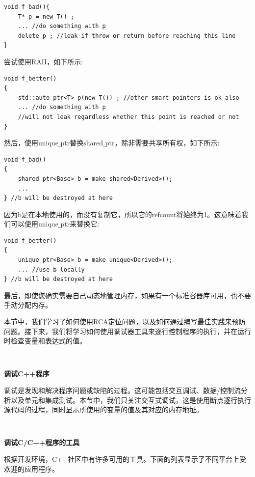 \begin{lstlisting}[caption={}]
void f_bad(){
	T* p = new T() ;
	... //do something with p
	delete p ; //leak if throw or return before reaching this line
}
\end{lstlisting}

尝试使用RAII，如下所示: \par

\begin{lstlisting}[caption={}]
void f_better()
{
	std::auto_ptr<T> p(new T()) ; //other smart pointers is ok also
	... //do something with p
	//will not leak regardless whether this point is reached or not
}
\end{lstlisting}

然后，使用unique\underline{ }ptr替换shared\underline{ }ptr，除非需要共享所有权，如下所示: \par

\begin{lstlisting}[caption={}]
void f_bad()
{
	shared_ptr<Base> b = make_shared<Derived>();
	...
} //b will be destroyed at here
\end{lstlisting}

因为b是在本地使用的，而没有复制它，所以它的refcount将始终为1。这意味着我们可以使用unique\underline{ }ptr来替换它: \par

\begin{lstlisting}[caption={}]
void f_better()
{
	unique_ptr<Base> b = make_unique<Derived>();
	... //use b locally
} //b will be destroyed at here
\end{lstlisting}

最后，即使您确实需要自己动态地管理内存，如果有一个标准容器库可用，也不要手动分配内存。 \par
本节中，我们学习了如何使用RCA定位问题，以及如何通过编写最佳实践来预防问题。接下来，我们将学习如何使用调试器工具来逐行控制程序的执行，并在运行时检查变量和表达式的值。 \par

\noindent\textbf{}\ \par
\textbf{调试C++程序} \ \par
调试是发现和解决程序问题或缺陷的过程。这可能包括交互调试、数据/控制流分析以及单元和集成测试。本节中，我们只关注交互式调试，这是使用断点逐行执行源代码的过程，同时显示所使用的变量的值及其对应的内存地址。 \par

\noindent\textbf{}\ \par
\textbf{调试C/C++程序的工具} \ \par
根据开发环境，C++社区中有许多可用的工具。下面的列表显示了不同平台上受欢迎的应用程序。 \par

